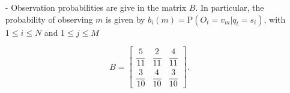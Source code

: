 {\begin{itemize}
\begin{itemize}
			\item[-] Observation probabilities are give in the matrix $B$. 
			In particular, the probability of observing $m$ is given by 
			$b_i(m)=\mathrm{P}(O_t=v_m|q_t=s_i)$, with $1 \leq i \leq N$ and 
			$1 \leq j \leq M$
			
			\begin{equation*}
			B = 
			\left[\begin{matrix}
			\dfrac{5}{11} & \dfrac{2}{11} & \dfrac{4}{11}\\[15pt]
			\dfrac{3}{10} & \dfrac{4}{10} & \dfrac{3}{10} 
			\end{matrix}\right]
			\mbox{.}
			\end{equation*}
			
				
		\end{itemize}
	\end{itemize}
}
